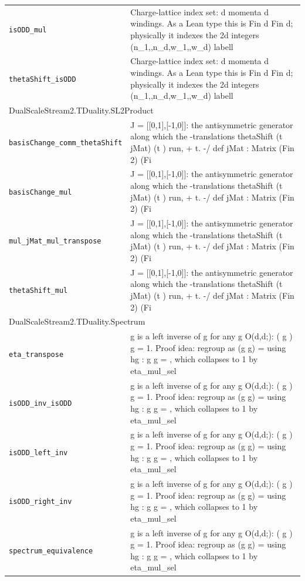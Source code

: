 \begin{longtable}{p{}p{}}
\quad\texttt{\footnotesize isODD\_mul} & {\footnotesize Charge-lattice index set: d momenta  d windings. As a Lean type this is Fin d  Fin d; physically it indexes the 2d integers (n\_1,,n\_d,w\_1,,w\_d) labell} \\
\quad\texttt{\footnotesize thetaShift\_isODD} & {\footnotesize Charge-lattice index set: d momenta  d windings. As a Lean type this is Fin d  Fin d; physically it indexes the 2d integers (n\_1,,n\_d,w\_1,,w\_d) labell} \\
\multicolumn{2}{l}{\textsf{\small DualScaleStream2.TDuality.SL2Product}} \\
\quad\texttt{\footnotesize basisChange\_comm\_thetaShift} & {\footnotesize J = [[0,1],[-1,0]]: the antisymmetric generator along which the -translations thetaShift (t  jMat) (t  ) run,    + t. -/ def jMat : Matrix (Fin 2) (Fi} \\
\quad\texttt{\footnotesize basisChange\_mul} & {\footnotesize J = [[0,1],[-1,0]]: the antisymmetric generator along which the -translations thetaShift (t  jMat) (t  ) run,    + t. -/ def jMat : Matrix (Fin 2) (Fi} \\
\quad\texttt{\footnotesize mul\_jMat\_mul\_transpose} & {\footnotesize J = [[0,1],[-1,0]]: the antisymmetric generator along which the -translations thetaShift (t  jMat) (t  ) run,    + t. -/ def jMat : Matrix (Fin 2) (Fi} \\
\quad\texttt{\footnotesize thetaShift\_mul} & {\footnotesize J = [[0,1],[-1,0]]: the antisymmetric generator along which the -translations thetaShift (t  jMat) (t  ) run,    + t. -/ def jMat : Matrix (Fin 2) (Fi} \\
\multicolumn{2}{l}{\textsf{\small DualScaleStream2.TDuality.Spectrum}} \\
\quad\texttt{\footnotesize eta\_transpose} & {\footnotesize  g  is a left inverse of g for any g  O(d,d;): ( g ) g = 1. Proof idea: regroup as  (g  g) =   using hg : g  g = , which collapses to 1 by eta\_mul\_sel} \\
\quad\texttt{\footnotesize isODD\_inv\_isODD} & {\footnotesize  g  is a left inverse of g for any g  O(d,d;): ( g ) g = 1. Proof idea: regroup as  (g  g) =   using hg : g  g = , which collapses to 1 by eta\_mul\_sel} \\
\quad\texttt{\footnotesize isODD\_left\_inv} & {\footnotesize  g  is a left inverse of g for any g  O(d,d;): ( g ) g = 1. Proof idea: regroup as  (g  g) =   using hg : g  g = , which collapses to 1 by eta\_mul\_sel} \\
\quad\texttt{\footnotesize isODD\_right\_inv} & {\footnotesize  g  is a left inverse of g for any g  O(d,d;): ( g ) g = 1. Proof idea: regroup as  (g  g) =   using hg : g  g = , which collapses to 1 by eta\_mul\_sel} \\
\quad\texttt{\footnotesize spectrum\_equivalence} & {\footnotesize  g  is a left inverse of g for any g  O(d,d;): ( g ) g = 1. Proof idea: regroup as  (g  g) =   using hg : g  g = , which collapses to 1 by eta\_mul\_sel} \\
\end{longtable}
